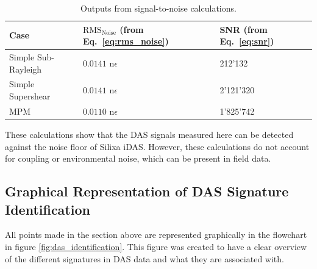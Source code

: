 \begin{table}[H]
\centering
\begin{tabular}{|l|l|l|}
\hline
\textbf{Case} & \textbf{$\text{RMS}_{\text{Noise}}$ (from Eq.~\ref{eq:rms_noise})} & \textbf{SNR (from Eq.~\ref{eq:snr})} \\ \hline
Simple Sub-Rayleigh & $0.0141\text{ n}\epsilon$ & 212'132 \\ \hline
Simple Supershear   & $0.0141\text{ n}\epsilon$ & 2'121'320 \\ \hline
MPM                 & $0.0110\text{ n}\epsilon$ & 1'825'742 \\ \hline
\end{tabular}
\caption{Outputs from signal-to-noise calculations.}
\label{tab:snr_output}
\end{table}

These calculations show that the DAS signals measured here can be detected against the noise floor of Silixa iDAS. However, these calculations do not account for coupling or environmental noise, which can be present in field data. \par 


\subsection{Graphical Representation of DAS Signature Identification}

All points made in the section above are represented graphically in the flowchart in figure \ref{fig:das_identification}. This figure was created to have a clear overview of the different signatures in DAS data and what they are associated with. 

  

